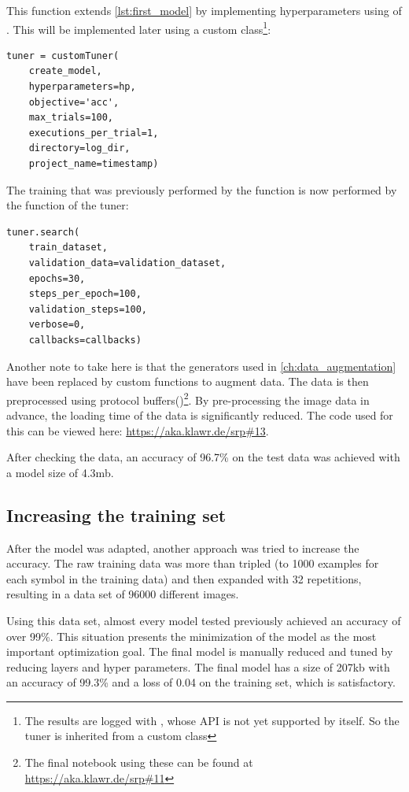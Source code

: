 This function extends \ref{lst:first_model} by implementing hyperparameters using  of .
This will be implemented later using a custom class\footnote{The results are logged with , whose API is not yet supported by  itself. So the tuner is inherited from a custom class}:

\begin{lstlisting}
tuner = customTuner(
    create_model,
    hyperparameters=hp,
    objective='acc',
    max_trials=100,
    executions_per_trial=1,
    directory=log_dir,
    project_name=timestamp)
\end{lstlisting}

The training that was previously performed by the  function is now performed by the  function of the tuner:

\begin{lstlisting}
tuner.search(
    train_dataset,
    validation_data=validation_dataset,
    epochs=30,
    steps_per_epoch=100,
    validation_steps=100,
    verbose=0,
    callbacks=callbacks)
\end{lstlisting}

Another note to take here is that the generators used in \ref{ch:data_augmentation} have been replaced by custom functions to augment data. The data is then preprocessed using protocol buffers()\footnote{The final notebook using these can be found at \url{https://aka.klawr.de/srp\#11}}.
By pre-processing the image data in advance, the loading time of the data is significantly reduced.
The code used for this can be viewed here: \url{https://aka.klawr.de/srp\#13}.

After checking the data, an accuracy of 96.7\% on the test data was achieved with a model size of 4.3mb.

\subsection{Increasing the training set}

After the model was adapted, another approach was tried to increase the accuracy.
The raw training data was more than tripled (to 1000 examples for each symbol in the training data) and then expanded with 32 repetitions, resulting in a data set of 96000 different images.

Using this data set, almost every model tested previously achieved an accuracy of over 99\%.
This situation presents the minimization of the model as the most important optimization goal.
The final model is manually reduced and tuned by reducing layers and hyper parameters.
The final model has a size of 207kb with an accuracy of 99.3\% and a loss of 0.04 on the training set, which is satisfactory.

